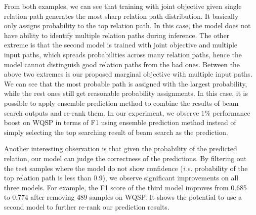 From both examples, we can see that training with joint objective given single relation path generates the most sharp relation path distribution. It basically only assigns probability to the top relation path. In this case, the model does not have ability to identify multiple relation paths during inference. The other extreme is that the second model is trained with joint objective and multiple input paths, which spreads probabilities across many relation paths, hence the model cannot distinguish good relation paths from the bad ones. Between the above two extremes is our proposed marginal objective with multiple input paths. We can see that the most probable path is assigned with the largest probability, while the rest ones still get reasonable probability assignments. In this case, it is possible to apply ensemble prediction method to combine the results of beam search outputs and re-rank them. In our experiment, we observe 1\% performance boost on WQSP in terms of F1 using ensemble prediction method instead of simply selecting the top searching result of beam search as the prediction.

Another interesting observation is that given the probability of the predicted relation, our model can judge the correctness of the predictions. By filtering out the test samples where the model do not show confidence (\emph{i.e.} probability of the top relation path is less than 0.9), we observe significant improvements on all three models. For example, the F1 score of the third model improves from 0.685 to 0.774 after removing 489 samples on WQSP. It shows the potential to use a second model to further re-rank our prediction results.

